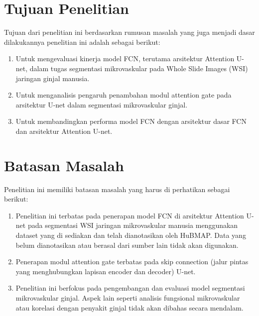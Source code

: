 \section{Tujuan Penelitian}

\noindent Tujuan dari penelitian ini berdasarkan rumusan masalah yang juga menjadi dasar dilakukannya penelitian ini adalah sebagai berikut:
\begin{enumerate}
    \item Untuk mengevaluasi kinerja model FCN, terutama arsitektur Attention U-net, dalam tugas segmentasi mikrovaskular pada Whole Slide Images (WSI) jaringan ginjal manusia.
    \item Untuk menganalisis pengaruh penambahan modul attention gate pada arsitektur U-net dalam segmentasi mikrovaskular ginjal.
    \item Untuk membandingkan performa model FCN dengan arsitektur dasar FCN dan arsitektur Attention U-net.
\end{enumerate}

\section{Batasan Masalah}
\noindent Penelitian ini memiliki batasan masalah yang harus di perhatikan sebagai berikut:
\begin{enumerate}
	\item Penelitian ini terbatas pada penerapan model FCN di arsitektur Attention U-net pada segmentasi WSI jaringan mikrovaskular manusia menggunakan dataset yang di sediakan dan telah dianotasikan oleh HuBMAP. Data yang belum dianotasikan atau berasal dari sumber lain tidak akan digunakan.
	\item Penerapan modul attention gate terbatas pada skip connection (jalur pintas yang menghubungkan lapisan encoder dan decoder) U-net.
	\item Penelitian ini berfokus pada pengembangan dan evaluasi model segmentasi mikrovaskular ginjal. Aspek lain seperti analisis fungsional mikrovaskular atau korelasi dengan penyakit ginjal tidak akan dibahas secara mendalam.
\end{enumerate}

